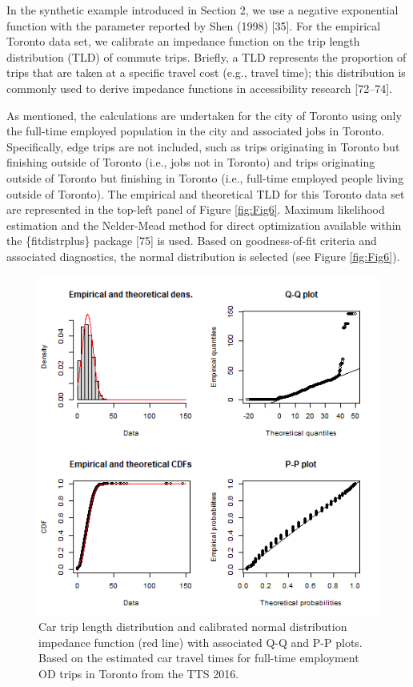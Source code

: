 \documentclass[10pt,letterpaper]{article}
\begin{document}
In the synthetic example introduced in Section 2, we use a negative
exponential function with the parameter reported by Shen (1998)
{[}35{]}. For the empirical Toronto data set, we calibrate an impedance
function on the trip length distribution (TLD) of commute trips.
Briefly, a TLD represents the proportion of trips that are taken at a
specific travel cost (e.g., travel time); this distribution is commonly
used to derive impedance functions in accessibility research
{[}72--74{]}.

As mentioned, the calculations are undertaken for the city of Toronto
using only the full-time employed population in the city and associated
jobs in Toronto. Specifically, edge trips are not included, such as
trips originating in Toronto but finishing outside of Toronto (i.e.,
jobs not in Toronto) and trips originating outside of Toronto but
finishing in Toronto (i.e., full-time employed people living outside of
Toronto). The empirical and theoretical TLD for this Toronto data set
are represented in the top-left panel of Figure \ref{fig:Fig6}. Maximum
likelihood estimation and the Nelder-Mead method for direct optimization
available within the \{fitdistrplus\} package {[}75{]} is used. Based on
goodness-of-fit criteria and associated diagnostics, the normal
distribution is selected (see Figure \ref{fig:Fig6}).

\begin{figure}

{\centering \includegraphics[width=1\linewidth]{images/Fig6} 

}

\caption{\label{fig:Fig6}Car trip length distribution and calibrated normal distribution impedance function (red line) with associated Q-Q and P-P plots. Based on the estimated car travel times for full-time employment OD trips in Toronto from the TTS 2016.}\label{fig:TLD-norm-plot}
\end{figure}
\end{document}
